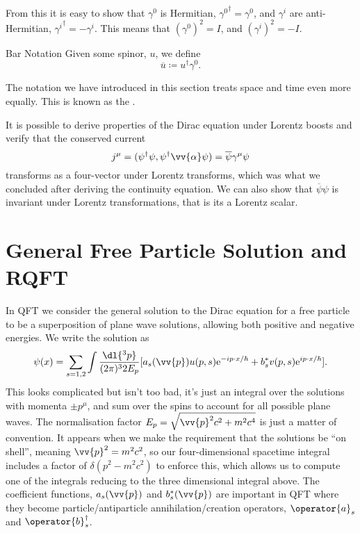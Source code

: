 \documentclass[fleqn]{NotesClass}
\newcommand*{\e}{\mathrm{e}}
\newcommand*{\hermit}{\dagger}
\newcommand{\ident}{I}
\begin{document}
    From this it is easy to show that \(\gamma^0\) is Hermitian, \({\gamma^0}^\hermit = \gamma^0\), and \(\gamma^i\) are anti-Hermitian, \({\gamma^i}^\hermit = -\gamma^i\).
    This means that \((\gamma^0)^2 = \ident\), and \((\gamma^i)^2 = -\ident\).
    
    \begin{ntn}{Bar Notation}{}
        Given some spinor, \(u\), we define
        \begin{equation}
            \overline{u} \coloneqq u^\hermit \gamma^0.
        \end{equation}
    \end{ntn}
    
    The notation we have introduced in this section treats space and time even more equally.
    This is known as the .
    
    It is possible to derive properties of the Dirac equation under Lorentz boosts and verify that the conserved current
    \begin{equation}
        j^\mu = (\psi^\hermit \psi, \psi^\hermit \vv{\alpha} \psi) = \overline{\psi} \gamma^\mu \psi
    \end{equation}
    transforms as a four-vector under Lorentz transforms, which was what we concluded after deriving the continuity equation.
    We can also show that \(\overline{\psi}\psi\) is invariant under Lorentz transformations, that is its a Lorentz scalar.
    
    \section{General Free Particle Solution and RQFT}
    In QFT we consider the general solution to the Dirac equation for a free particle to be a superposition of plane wave solutions, allowing both positive and negative energies.
    We write the solution as
    \begin{equation}
        \psi(x) = \sum_{s = 1, 2} \int \frac{\dl{^3p}}{(2\pi)^32E_p} [a_s(\vv{p})u(p, s)\e^{-ip\cdot x/\hbar} + b_s^*v(p, s)\e^{ip\cdot x/\hbar}].
    \end{equation}
    This looks complicated but isn't too bad, it's just an integral over the solutions with momenta \(\pm p^\mu\), and sum over the spins to account for all possible plane waves.
    The normalisation factor \(E_p = \sqrt{\vv{p}^2c^2 + m^2c^4}\) is just a matter of convention.
    It appears when we make the requirement that the solutions be \enquote{on shell}, meaning \(\vv{p}^2 = m^2c^2\), so our four-dimensional spacetime integral includes a factor of \(\delta(p^2 - m^2c^2)\) to enforce this, which allows us to compute one of the integrals reducing to the three dimensional integral above.
    The coefficient functions, \(a_s(\vv{p})\) and \(b_s^*(\vv{p})\) are important in QFT where they become particle/antiparticle annihilation/creation operators, \(\operator{a}_s\) and \(\operator{b}_s^\hermit\).
    
\end{document}
